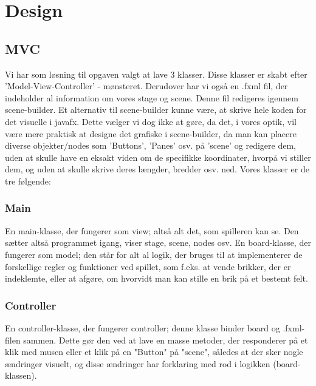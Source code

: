 \section{Design}
\subsection{MVC}\label{MVC}
Vi har som løsning til opgaven valgt at lave 3 klasser. Disse klasser er skabt efter 'Model-View-Controller' - mønsteret. Derudover har vi også en .fxml fil, der indeholder al information om vores stage og scene. Denne fil redigeres igennem scene-builder. Et alternativ til scene-builder kunne være, at skrive hele koden for det visuelle i javafx. Dette vælger vi dog ikke at gøre, da det, i vores optik, vil være mere praktisk at designe det grafiske i scene-builder, da man kan placere diverse objekter/nodes som 'Buttons', 'Panes' osv. på 'scene' og redigere dem, uden at skulle have en eksakt viden om de specifikke koordinater, hvorpå vi stiller dem, og uden at skulle skrive deres længder, bredder osv. ned. Vores klasser er de tre følgende:
\subsubsection{Main}
En main-klasse, der fungerer som view; altså alt det, som spilleren kan se. Den sætter altså programmet igang, viser stage, scene, nodes osv. En board-klasse, der fungerer som model; den står for alt al logik, der bruges til at implementerer de forskellige regler og funktioner ved spillet, som f.eks. at vende brikker, der er indeklemte, eller at afgøre, om hvorvidt man kan stille en brik på et bestemt felt. 
\subsubsection{Controller}
En controller-klasse, der fungerer controller; denne klasse binder board og .fxml-filen sammen. Dette gør den ved at lave en masse metoder, der responderer på et klik med musen eller et klik på en "Button" på "scene", således at der sker nogle ændringer visuelt, og disse ændringer har forklaring med rod i logikken (board-klassen).
